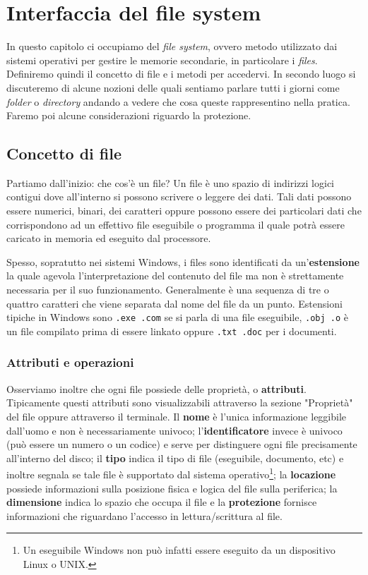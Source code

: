 \pagebreak
\section{Interfaccia del file system}\label{file system}
In questo capitolo ci occupiamo del \textit{file system}, ovvero metodo utilizzato dai sistemi operativi per gestire le memorie secondarie, in particolare i \textit{files}. Definiremo quindi il concetto di file e i metodi per accedervi. In secondo luogo si discuteremo di alcune nozioni delle quali sentiamo parlare tutti i giorni come \textit{folder} o \textit{directory} andando a vedere che cosa queste rappresentino nella pratica. Faremo poi alcune considerazioni riguardo la protezione.

\subsection{Concetto di file}
Partiamo dall'inizio: che cos'è un file? Un file è uno spazio di indirizzi logici contigui dove all'interno si possono scrivere o leggere dei dati. Tali dati possono essere numerici, binari, dei caratteri oppure possono essere dei particolari dati che corrispondono ad un effettivo file eseguibile o programma il quale potrà essere caricato in memoria ed eseguito dal processore.

Spesso, sopratutto nei sistemi Windows, i files sono identificati da un'\textbf{estensione} la quale agevola l'interpretazione del contenuto del file ma non è strettamente necessaria per il suo funzionamento. Generalmente è una sequenza di tre o quattro caratteri che viene separata dal nome del file da un punto. Estensioni tipiche in Windows sono \texttt{.exe .com} se si parla di una file eseguibile, \texttt{.obj .o} è un file compilato prima di essere linkato oppure \texttt{.txt .doc} per i documenti.

\subsubsection{Attributi e operazioni}\label{operazioni files}
Osserviamo inoltre che ogni file possiede delle proprietà, o \textbf{attributi}. Tipicamente questi attributi sono visualizzabili attraverso la sezione "Proprietà" del file oppure attraverso il terminale. Il \textbf{nome} è l'unica informazione leggibile dall'uomo e non è necessariamente univoco; l'\textbf{identificatore} invece è univoco (può essere un numero o un codice) e serve per distinguere ogni file precisamente all'interno del disco; il \textbf{tipo} indica il tipo di file (eseguibile, documento, etc) e inoltre segnala se tale file è supportato dal sistema operativo\footnote{Un eseguibile Windows non può infatti essere eseguito da un dispositivo Linux o UNIX.}; la \textbf{locazione} possiede informazioni sulla posizione fisica e logica del file sulla periferica; la \textbf{dimensione} indica lo spazio che occupa il file e la \textbf{protezione} fornisce informazioni che riguardano l'accesso in lettura/scrittura al file.

